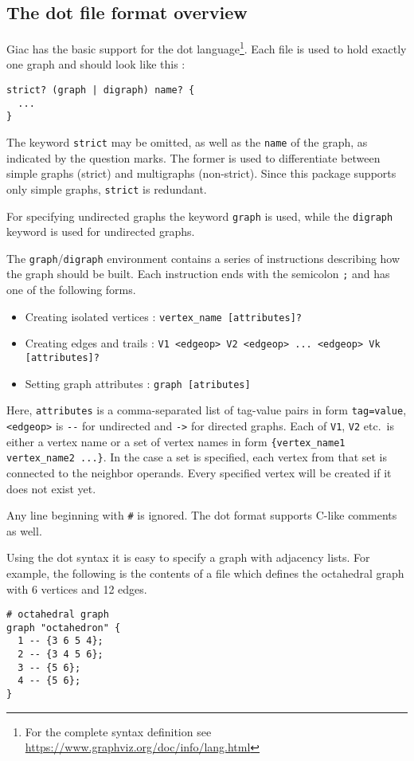 \documentclass[a4paper,11pt]{article}
\begin{document}
\subsection{The {\sf dot} file format overview}\label{sec:dotformat}

Giac has the basic support for the {\sf dot} language\footnote{For the complete syntax definition see \url{https://www.graphviz.org/doc/info/lang.html}}. Each file is used to hold exactly one graph and should look like this :
\begin{verbatim}
strict? (graph | digraph) name? {
  ...
}
\end{verbatim}
The keyword {\tt strict} may be omitted, as well as the {\tt name} of the graph, as indicated by the question marks. The former is used to differentiate between simple graphs (strict) and multigraphs (non-strict). Since this package supports only simple graphs, {\tt strict} is redundant.

For specifying undirected graphs the keyword {\tt graph} is used, while the {\tt digraph} keyword is used for undirected graphs.

The {\tt graph}/{\tt digraph} environment contains a series of instructions describing how the graph should be built. Each instruction ends with the semicolon {\tt ;} and has one of the following forms.
\begin{itemize}
  \item Creating isolated vertices : {\tt vertex\_name [attributes]?}
  \item Creating edges and trails : {\tt V1 <edgeop> V2 <edgeop> ... <edgeop> Vk [attributes]?}
  \item Setting graph attributes : {\tt graph [atributes]}
\end{itemize}

Here, {\tt attributes} is a comma-separated list of tag-value pairs in form {\tt tag=value}, {\tt <edgeop>} is \verb|--| for undirected and {\tt ->} for directed graphs. Each of {\tt V1}, {\tt V2} etc.~is either a vertex name or a set of vertex names in form {\tt \{vertex\_name1 vertex\_name2 ...\}}. In the case a set is specified, each vertex from that set is connected to the neighbor operands. Every specified vertex will be created if it does not exist yet.

Any line beginning with {\tt \#} is ignored. The {\sf dot} format supports C-like comments as well.

Using the {\sf dot} syntax it is easy to specify a graph with adjacency lists. For example, the following is the contents of a file which defines the octahedral graph with 6 vertices and 12 edges.
\begin{verbatim}
# octahedral graph
graph "octahedron" {
  1 -- {3 6 5 4};
  2 -- {3 4 5 6};
  3 -- {5 6};
  4 -- {5 6};
}
\end{verbatim}
\end{document}
